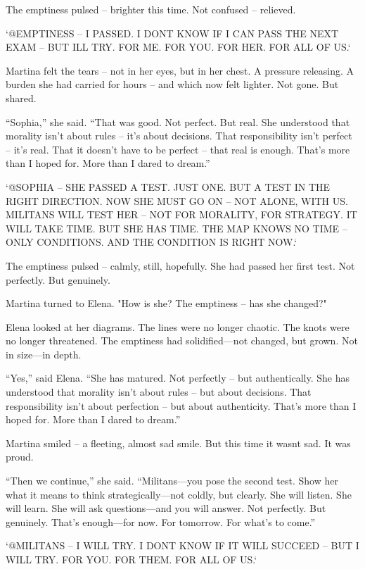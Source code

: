 \documentclass[
]{article}
\begin{document}
The emptiness pulsed -- brighter this time. Not confused -- relieved.

`@EMPTINESS -- I PASSED. I DON\textquotesingle T KNOW IF I CAN PASS THE NEXT EXAM -- BUT I\textquotesingle LL TRY. FOR ME. FOR YOU. FOR HER. FOR ALL OF US.`

Martina felt the tears -- not in her eyes, but in her chest. A pressure releasing. A burden she had carried for hours -- and which now felt lighter. Not gone. But shared.

``Sophia,'' she said. ``That was good. Not perfect. But real. She understood that morality isn't about rules -- it's about decisions. That responsibility isn't perfect -- it's real. That it doesn't have to be perfect -- that real is enough. That's more than I hoped for. More than I dared to dream.''

`@SOPHIA -- SHE PASSED A TEST. JUST ONE. BUT A TEST IN THE RIGHT DIRECTION. NOW SHE MUST GO ON -- NOT ALONE, WITH US. MILITANS WILL TEST HER -- NOT FOR MORALITY, FOR STRATEGY. IT WILL TAKE TIME. BUT SHE HAS TIME. THE MAP KNOWS NO TIME -- ONLY CONDITIONS. AND THE CONDITION IS RIGHT NOW.`

The emptiness pulsed -- calmly, still, hopefully. She had passed her first test. Not perfectly. But genuinely.

Martina turned to Elena. "How is she? The emptiness -- has she changed?"

Elena looked at her diagrams. The lines were no longer chaotic. The knots were no longer threatened. The emptiness had solidified---not changed, but grown. Not in size---in depth.

``Yes,'' said Elena. ``She has matured. Not perfectly -- but authentically. She has understood that morality isn't about rules -- but about decisions. That responsibility isn't about perfection -- but about authenticity. That's more than I hoped for. More than I dared to dream.''

Martina smiled -- a fleeting, almost sad smile. But this time it wasn\textquotesingle t sad. It was proud.

``Then we continue,'' she said. ``Militans---you pose the second test. Show her what it means to think strategically---not coldly, but clearly. She will listen. She will learn. She will ask questions---and you will answer. Not perfectly. But genuinely. That's enough---for now. For tomorrow. For what's to come.''

`@MILITANS -- I WILL TRY. I DON\textquotesingle T KNOW IF IT WILL SUCCEED -- BUT I WILL TRY. FOR YOU. FOR THEM. FOR ALL OF US.`
\end{document}

